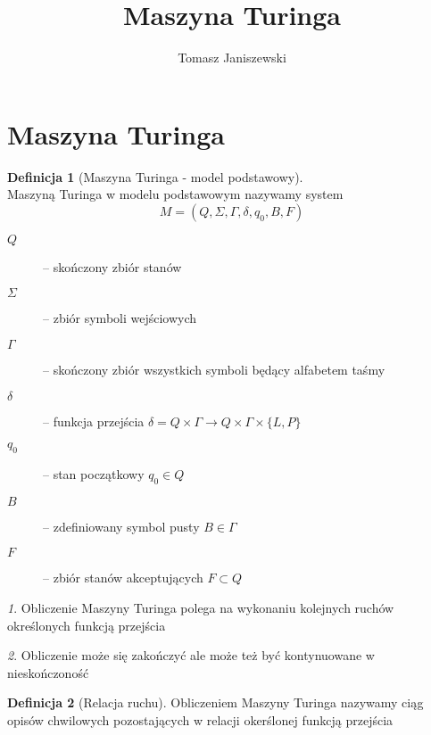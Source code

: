 \documentclass{beamer}
\title{Maszyna Turinga}
\author{Tomasz Janiszewski}
\date{}
\institute{MiNI PW}
\theoremstyle{definition}
\newtheorem{df}{Definicja}
\theoremstyle{remark}
\newtheorem{uwaga}{}
\begin{document}
\begin{frame}
\titlepage
\end{frame}
\section{Maszyna Turinga}

\begin{frame}
	\begin{df}[Maszyna Turinga - model podstawowy]~\\
	Maszyną Turinga w modelu podstawowym nazywamy system
	\begin{equation}
	M = (Q, \Sigma, \Gamma, \delta, q_0, B, F)
	\end{equation}
	\begin{description}
	\item[$Q$] -- skończony zbiór stanów
	\item[$\Sigma$] -- zbiór symboli wejściowych
	\item[$\Gamma$] -- skończony zbiór wszystkich symboli będący alfabetem taśmy
	\item[$\delta$] -- funkcja przejścia $\delta = Q\times\Gamma \rightarrow Q\times\Gamma\times\{L,P\}$
	\item[$q_0$] -- stan początkowy $q_0 \in Q$
	\item[$B$] -- zdefiniowany symbol pusty $B\in\Gamma$
	\item[$F$] -- zbiór stanów akceptujących $F\subset Q$
	\end{description}
	\end{df}	
\end{frame}

\begin{frame}
	\begin{uwaga}
		Obliczenie Maszyny Turinga polega na wykonaniu kolejnych ruchów określonych funkcją przejścia
	\end{uwaga}
\end{frame}

\begin{frame}
	\begin{uwaga}
		Obliczenie może się zakończyć ale może też być kontynuowane w nieskończoność
	\end{uwaga}
\end{frame}

\begin{frame}
	\begin{df}[Relacja ruchu]
		Obliczeniem Maszyny Turinga nazywamy ciąg opisów chwilowych pozostających w relacji okerślonej funkcją przejścia
	\end{df}
\end{frame}
\end{document}
